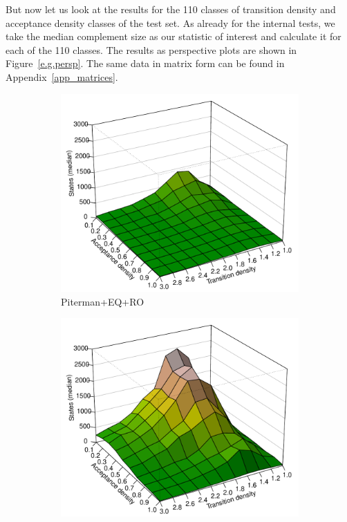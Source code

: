 But now let us look at the results for the 110 classes of transition density and acceptance density classes of the \goal{} test set. As already for the internal tests, we take the median complement size as our statistic of interest and calculate it for each of the 110 classes. The results as perspective plots are shown in Figure~\ref{e.g.persp}. The same data in matrix form can be found in Appendix~\ref{app_matrices}.

\renewcommand{\perspwidth}{0.3}
\begin{figure}[ht]
\centering
  \hfill
  \begin{subfigure}[t]{\perspwidth\textwidth}
  \centering
  \includegraphics[width=\textwidth]{figures/r/external/goal/s.median.Piterman+EQ+RO.pdf}
  \caption{Piterman+EQ+RO}
  \end{subfigure}
  \hfill
  \begin{subfigure}[t]{\perspwidth\textwidth}
  \centering
  \includegraphics[width=\textwidth]{figures/r/external/goal/s.median.Slice+P+RO+MADJ+EG.pdf}

\end{subfigure}
\end{figure}
